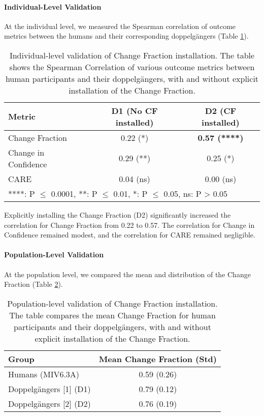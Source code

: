\paragraph{Individual-Level Validation}

At the individual level, we measured the Spearman correlation of outcome metrics between the humans and their corresponding doppelgängers (Table \ref{tab:cf_installation_individual}).

\begin{table}[h]
\centering
\caption[Individual-level Validation of Change Fraction Installation]{Individual-level validation of Change Fraction installation. The table shows the Spearman Correlation of various outcome metrics between human participants and their doppelgängers, with and without explicit installation of the Change Fraction.}
\label{tab:cf_installation_individual}
\begin{tabular}{|l|c|c|}
\hline
\textbf{Metric} & \textbf{D1 (No CF installed)} & \textbf{D2 (CF installed)} \\ \hline
Change Fraction & 0.22 (*) & \textbf{0.57 (****)} \\
Change in Confidence & 0.29 (**) & 0.25 (*) \\
CARE & 0.04 (ns) & 0.00 (ns) \\ \hline
\multicolumn{3}{l}{\footnotesize{****: P $\leq$ 0.0001, **: P $\leq$ 0.01, *: P $\leq$ 0.05, ns: P > 0.05}}
\end{tabular}
\end{table}

Explicitly installing the Change Fraction (D2) significantly increased the correlation for Change Fraction from 0.22 to 0.57. The correlation for Change in Confidence remained modest, and the correlation for CARE remained negligible.

\paragraph{Population-Level Validation}

At the population level, we compared the mean and distribution of the Change Fraction (Table \ref{tab:cf_installation_population}).

\begin{table}[h]
\centering
\caption[Population-level Validation of Change Fraction Installation]{Population-level validation of Change Fraction installation. The table compares the mean Change Fraction for human participants and their doppelgängers, with and without explicit installation of the Change Fraction.}
\label{tab:cf_installation_population}
\begin{tabular}{|l|c|}
\hline
\textbf{Group} & \textbf{Mean Change Fraction (Std)} \\ \hline
Humans (MIV6.3A) & 0.59 (0.26) \\
Doppelgängers [1] (D1) & 0.79 (0.12) \\
Doppelgängers [2] (D2) & 0.76 (0.19) \\ \hline
\end{tabular}
\end{table}

